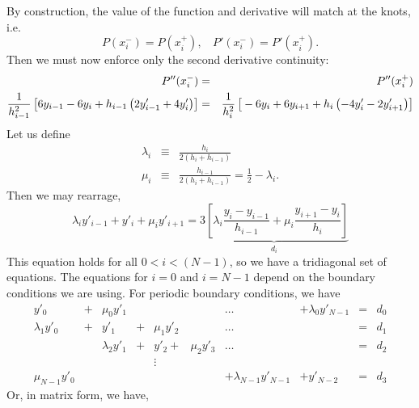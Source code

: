 \documentclass{article}
\begin{document}
By construction, the value of the function and derivative will match
at the knots, i.e.
\begin{equation}
P(x_i^-) = P(x_i^+), \ \ \ \ P'(x_i^-) = P'(x_i^+).
\end{equation}
Then we must now enforce only the second derivative continuity:
\begin{eqnarray}
P''(x_i^-) & = & P''(x_i^+) \\
\frac{1}{h_{i-1}^2}\left[\rule{0pt}{0.3cm}6 y_{i-1} -6 y_i + h_{i-1}\left(2 y'_{i-1} +4 y'_i\right) \right]& = &
\frac{1}{h_i^2}\left[\rule{0pt}{0.3cm}-6 y_i + 6 y_{i+1} +h_i\left( -4 y'_i -2 y'_{i+1} \right)\right] \nonumber
\end{eqnarray}
Let us define
\begin{eqnarray}
\lambda_i & \equiv & \frac{h_i}{2(h_i+h_{i-1})} \\
\mu_i & \equiv & \frac{h_{i-1}}{2(h_i+h_{i-1})}  = \frac{1}{2} - \lambda_i.
\end{eqnarray}
Then we may rearrage,
\begin{equation}
\lambda_i y'_{i-1} + y'_i + \mu_i y'_{i+1} = \underbrace{3 \left[\lambda_i \frac{y_i - y_{i-1}}{h_{i-1}} + \mu_i \frac{y_{i+1}
    - y_i}{h_i} \right] }_{d_i}
\end{equation}
This equation holds for all $0<i<(N-1)$, so we have a tridiagonal set of
equations.  The equations for $i=0$ and $i=N-1$ depend on the boundary
conditions we are using.  For periodic boundary conditions, we have
\begin{equation}
\begin{matrix}
y'_0           & +  & \mu_0 y'_1     &   &                   &            & \dots                   & +  \lambda_0 y'_{N-1} & = & d_0 \\
\lambda_1 y'_0 & +  & y'_1           & + &  \mu_1 y'_2       &            & \dots                   &                       & = & d_1 \\
               &    & \lambda_2 y'_1 & + &  y'_2           + & \mu_2 y'_3 & \dots                   &                       & = & d_2 \\
               &    &                &   &  \vdots           &            &                         &                       &   &     \\
\mu_{N-1} y'_0 &    &                &   &                   &            & +\lambda_{N-1} y'_{N-1} & +  y'_{N-2}           & = & d_3 
\end{matrix}
\end{equation}
Or, in matrix form, we have,
\end{document}
